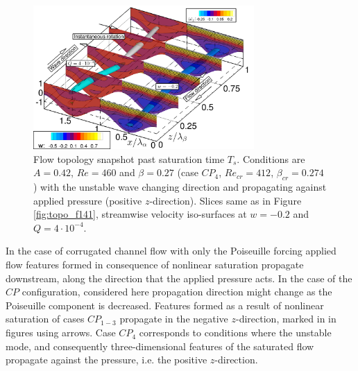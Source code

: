 \documentclass[lineno]{jfm}
\begin{document}
\begin{figure}
\centering
    \includegraphics[width=0.75\textwidth]{f084.png}
	\caption{Flow topology snapshot past saturation time $T_s$. Conditions are
$A=0.42$, $Re=460$ and $\beta=0.27$ (case $CP_4$, $Re_{cr}=412$, $\beta_{cr}=0.274$) with the unstable wave changing direction and propagating against applied pressure (positive $z$-direction).
Slices same as in Figure \ref{fig:topo_f141},
streamwise velocity iso-surfaces at $w=-0.2$ and $Q=4\cdot10^{-4}$.}
	\label{fig:topo_f084}
\end{figure}

In the case of corrugated channel flow with only the Poiseuille forcing applied \citep{Nikesh2017,Nikesh2021} flow features formed in consequence of nonlinear saturation propagate downstream, along the direction that the applied pressure acts.
In the case of the $CP$ configuration, considered here propagation direction might change as the Poiseuille component is decreased.
Features formed as a result of nonlinear saturation of cases $CP_{1-3}$ propagate in the negative $z$-direction, marked in in figures using arrows.
Case $CP_4$ corresponds to conditions where the unstable mode, and consequently three-dimensional features of the saturated flow propagate against the pressure, i.e. the positive $z$-direction.
\end{document}
